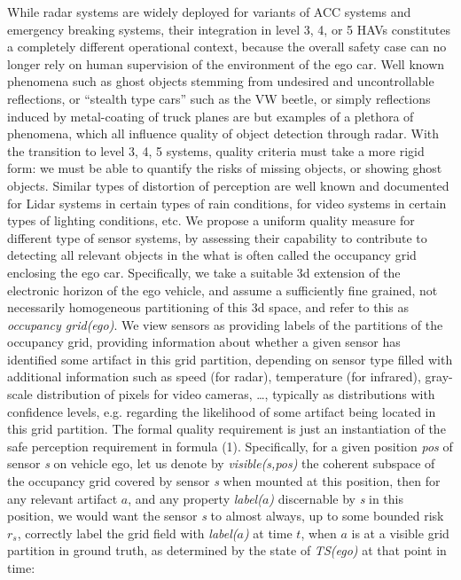 While radar systems are widely deployed for variants of ACC systems and emergency breaking systems, their integration in level 3, 4, or 5 HAVs constitutes a completely different operational context, because the overall safety case can no longer rely on human supervision of the environment of the ego car. Well known phenomena such as ghost objects stemming from undesired and uncontrollable reflections, or \enquote{stealth type cars} such as the VW beetle, or simply reflections induced by metal-coating of truck planes are but examples of a plethora of phenomena, which all influence quality of object detection through radar. With the transition to level 3, 4, 5 systems, quality criteria must take a more rigid form: we must be able to quantify the risks of missing objects, or showing ghost objects. Similar types of distortion of perception are well known and documented for Lidar systems in certain types of rain conditions, for video systems in certain types of lighting conditions, etc. We propose a uniform quality measure for different type of sensor systems, by assessing their capability to contribute to detecting all relevant objects in the what is often called the occupancy grid enclosing the ego car. Specifically, we take a suitable 3d extension of the electronic horizon of the ego vehicle, and assume a sufficiently fine grained, not necessarily homogeneous partitioning of this 3d space, and refer to this as \emph{occupancy grid(ego)}. We view sensors as providing labels of the partitions of the occupancy grid, providing information about whether a given sensor has identified some artifact in this grid partition, depending on sensor type filled with additional information such as speed (for radar), temperature (for infrared), gray-scale distribution of pixels for video cameras, \ldots, typically as distributions with confidence levels, e.g. regarding the likelihood of some artifact being located in this grid partition. The formal quality requirement is just an instantiation of the safe perception requirement in formula (1). Specifically, for a given position \textit{pos}  of sensor  \textit{s}  on vehicle ego, let us denote by \textit{visible(s,pos)} the coherent subspace of the occupancy grid covered by sensor \textit{s} when mounted at this position, then for any relevant artifact  $a$, and any property  \textit{label($a$)} discernable by  \textit{s}  in this position, we would want the sensor \textit{s} to almost always, up to some bounded risk $r_s$, correctly label the grid field with \textit{label($a$)} at time $t$, when $a$ is at a visible grid partition in ground truth, as determined by the state of \textit{TS(ego)} at that point in time:

